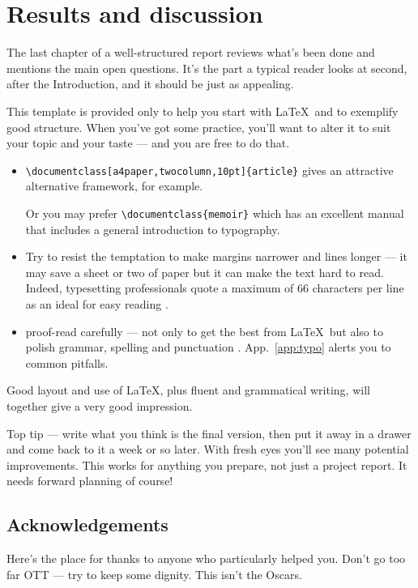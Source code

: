 \chapter{Results and discussion}\label{sec:results}
The last chapter of a well-structured report reviews what's been done and
mentions the main open questions.  It's the part a typical reader looks
at second, after the Introduction, and it should be just as appealing.
\par
This template is provided only to help you start with \LaTeX\ and to
exemplify good structure. When you've got some practice, you'll want to
alter it to suit your topic and your taste --- and you are free to do
that.
\begin{itemize}
    \item\verb+\documentclass[a4paper,twocolumn,10pt]{article}+
    gives an attractive alternative framework, for example.\par Or you
may prefer \verb+\documentclass{memoir}+ which has an excellent
manual \cite{MEM} that includes a general introduction to typography.
    \item Try to resist the temptation to make margins narrower
    and lines longer --- it may save a sheet or two of paper but it
    can make the text hard to read. Indeed, typesetting professionals 
    quote a maximum of 66 characters per line as an ideal for easy reading
          \cite[Sec.~5.2.2]{NSS}.
    \item proof-read carefully --- not only to get the best from \LaTeX\
but also to polish grammar, spelling and punctuation \cite{ESL}.
App.~\ref{app:typo} alerts you to common pitfalls.
\end{itemize}
Good layout and use of \LaTeX, plus fluent and grammatical writing, will
together give a very good impression.
\par
Top tip --- write what you think is the final version, then put it
away in a drawer and come back to it a week or so later. With fresh
eyes you'll see many potential improvements. This works for anything you
prepare, not just a project report. It needs forward planning of
course!
\newpage
\section*{Acknowledgements}
Here's the place for thanks to anyone who particularly helped you.
Don't go too far OTT --- try to keep some dignity. This isn't the 
Oscars.

